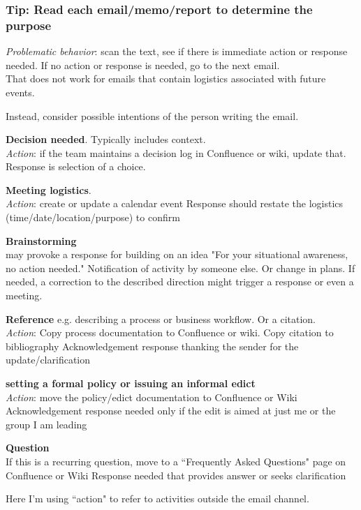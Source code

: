 \subsubsection{Tip: Read each email/memo/report to determine the purpose }

\textit{Problematic behavior}: scan the text, see if there is immediate action or response needed. If no action or response is needed, go to the next email. \\
 That does not work for emails that contain logistics associated with future events. 

Instead, consider possible intentions of the person writing the email. 

\textbf{Decision needed}.  Typically includes context. \\
\textit{Action}: if the team maintains a decision log in Confluence or wiki, update that.
Response is selection of a choice.

\textbf{Meeting logistics}.\\
\textit{Action}: create or update a calendar event
Response should restate the logistics (time/date/location/purpose) to confirm

\textbf{Brainstorming}\\
may provoke a response for building on an idea
"For your situational awareness, no action needed." Notification of activity by someone else. Or change in plans. 
If needed, a correction to the described direction might trigger a response or even a meeting.

\textbf{Reference} e.g. describing a process or business workflow. Or a citation.\\
\textit{Action}: Copy process documentation to Confluence or wiki. Copy citation to bibliography
Acknowledgement response thanking the sender for the update/clarification

\textbf{setting a formal policy or issuing an informal edict}\\
\textit{Action}: move the policy/edict documentation to Confluence or Wiki
Acknowledgement response needed only if the edit is aimed at just me or the group I am leading

\textbf{Question}\\
If this is a recurring question, move to a ``Frequently Asked Questions" page on Confluence or Wiki
Response needed that provides answer or seeks clarification


Here I'm using ``action" to refer to activities outside the email channel. 

